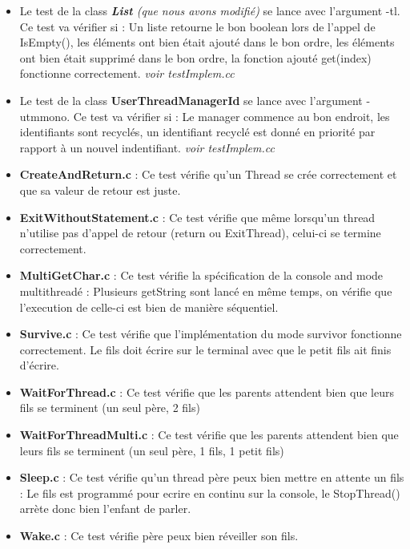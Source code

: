 \documentclass{article}
\begin{document}
\begin{itemize}
	\item Le test de la class \textit{\textbf{ List} (que nous avons modifié)} se lance avec l'argument -tl. Ce test va vérifier si : Un liste retourne le bon boolean lors de l'appel de IsEmpty(), les éléments ont bien était ajouté dans le bon ordre, les éléments ont bien était supprimé dans le bon ordre, la fonction ajouté get(index) fonctionne correctement. \textit{voir testImplem.cc}


\item Le test de la class \textbf{UserThreadManagerId} se lance avec l'argument -utmmono. Ce test va vérifier si : Le manager commence au bon endroit, les identifiants sont recyclés, un identifiant recyclé est donné en priorité par rapport à un nouvel indentifiant. \textit{voir testImplem.cc}

\item \textbf{CreateAndReturn.c} : Ce test vérifie qu'un Thread se crée correctement et que sa valeur de retour est juste.

\item \textbf{ExitWithoutStatement.c} : Ce test vérifie que même lorsqu'un thread n'utilise pas d'appel de retour (return ou ExitThread), celui-ci se termine correctement.

\item \textbf{MultiGetChar.c} : Ce test vérifie la spécification de la console and mode multithreadé : Plusieurs getString sont lancé en même temps, on vérifie que l'execution de celle-ci est bien de manière séquentiel.


\item \textbf{Survive.c} : Ce test vérifie que l'implémentation du mode survivor fonctionne correctement. Le fils doit écrire sur le terminal avec que le petit fils ait finis d'écrire.

\item \textbf{WaitForThread.c} : Ce test vérifie que les parents attendent bien que leurs fils se terminent (un seul père, 2 fils)

\item \textbf{WaitForThreadMulti.c} : Ce test vérifie que les parents attendent bien que leurs fils se terminent (un seul père, 1 fils, 1 petit fils)

		\item \textbf{Sleep.c} : Ce test vérifie qu'un thread père peux bien mettre en attente un fils : Le fils est programmé pour ecrire en continu sur la console, le StopThread() arrète donc bien l'enfant de parler.

\item \textbf{Wake.c} :	Ce test vérifie père peux bien réveiller son fils.




\end{itemize}
\end{document}
